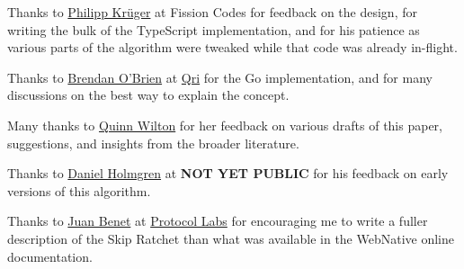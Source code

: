 \documentclass{article}
\begin{document}
    Thanks to \href{https://github.com/matheus23/}{Philipp Krüger} at Fission Codes for  feedback on the design, for writing the bulk of the TypeScript implementation\cite{ts-wnfs-ratchet}, and for his patience as various parts of the algorithm were tweaked while that code was already in-flight.
    
    Thanks to \href{https://github.com/b5/}{Brendan O'Brien} at \href{https://qri.io/}{Qri} for the {Go implementation}\cite{go-wnfs-ratchet}, and for many discussions on the best way to explain the concept.
    
    Many thanks to \href{https://github.com/QuinnWilton}{Quinn Wilton} for her feedback on various drafts of this paper, suggestions, and insights from the broader literature.
    
    Thanks to \href{https://github.com/dholms}{Daniel Holmgren} at \textbf{NOT YET PUBLIC} for his feedback on early versions of this algorithm.
    
    Thanks to \href{https://github.com/jbenet/}{Juan Benet} at \href{https://protocol.ai/}{Protocol Labs} for encouraging me to write a fuller description of the Skip Ratchet than what was available in the WebNative online documentation.
    
    \printbibliography[title={References}]
\end{document}
